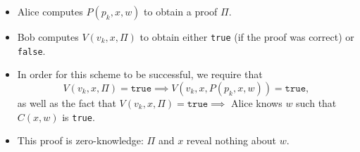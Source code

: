 \documentclass[twoside]{article}
\begin{document}
\begin{itemize}
\begin{itemize}
	\item Alice computes $P(p_k, x, w)$ to obtain a proof $\Pi$.
	\item Bob computes $V(v_k, x, \Pi)$ to obtain either \texttt{true} (if the proof was correct) or \texttt{false}.
	\item In order for this scheme to be successful, we require that
		\begin{equation}
		V(v_k, x, \Pi) = \texttt{true} \implies V(v_k, x, P(p_k, x, w)) = \texttt{true},
		\end{equation}
		as well as the fact that $V(v_k, x, \Pi) = \texttt{true} \implies$ Alice knows $w$ such that $C(x, w)$ is \texttt{true}.
	\item This proof is zero-knowledge: $\Pi$ and $x$ reveal nothing about $w$.
	\end{itemize}
\end{itemize}


\end{document}
